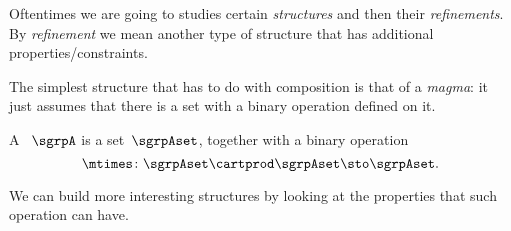 

\label{ch:monoids}

Oftentimes we are going to studies certain \emph{structures} and then their \emph{refinements}.
By \emph{refinement} we mean another type of structure that has additional properties/constraints.

The simplest structure that has to do with composition is that of a \emph{magma}: it just assumes that there is a set with a binary operation defined on it.

\begin{definition}[Magma]
  \label{def:magma}
  A \emph{}~$\sgrpA$ is a set~$\sgrpAset$, together with a binary operation
  \begin{equation}
    \mtimes  \colon \sgrpAset \cartprod \sgrpAset \sto \sgrpAset.
  \end{equation}
 \end{definition}

We can build more interesting structures by looking at the properties that such operation can have.













